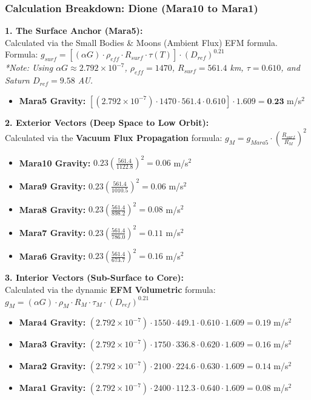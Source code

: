 \documentclass[11pt, a4paper]{article}
\begin{document}
\clearpage
\subsubsection{Calculation Breakdown: Dione (Mara10 to Mara1)}

\noindent \textbf{1. The Surface Anchor (Mara5):} \\
Calculated via the Small Bodies \& Moons (Ambient Flux) EFM formula. \\
Formula: $g_{surf} = \left[ (\alpha G) \cdot \rho_{eff} \cdot R_{surf} \cdot \tau(T) \right] \cdot (D_{ref})^{0.21}$ \\
\textit{*Note: Using $\alpha G \approx 2.792 \times 10^{-7}$, $\rho_{eff} = 1470$, $R_{surf} = 561.4$ km, $\tau = 0.610$, and Saturn $D_{ref} = 9.58$ AU.}
\begin{itemize}
  \item \textbf{Mara5 Gravity:} $\left[ (2.792 \times 10^{-7}) \cdot 1470 \cdot 561.4 \cdot 0.610 \right] \cdot 1.609 = \textbf{0.23}$ m/s$^2$
\end{itemize}

\vspace{0.5em}
\noindent \textbf{2. Exterior Vectors (Deep Space to Low Orbit):} \\
Calculated via the \textbf{Vacuum Flux Propagation} formula: $g_M = g_{Mara5} \cdot \left( \frac{R_{surf}}{R_M} \right)^2$
\begin{itemize}
  \item \textbf{Mara10 Gravity:} $0.23 \left( \frac{561.4}{1122.8} \right)^2 = 0.06$ m/s$^2$
  \item \textbf{Mara9 Gravity:} $0.23 \left( \frac{561.4}{1010.5} \right)^2 = 0.06$ m/s$^2$
  \item \textbf{Mara8 Gravity:} $0.23 \left( \frac{561.4}{898.2} \right)^2 = 0.08$ m/s$^2$
  \item \textbf{Mara7 Gravity:} $0.23 \left( \frac{561.4}{786.0} \right)^2 = 0.11$ m/s$^2$
  \item \textbf{Mara6 Gravity:} $0.23 \left( \frac{561.4}{673.7} \right)^2 = 0.16$ m/s$^2$
\end{itemize}

\vspace{0.5em}
\noindent \textbf{3. Interior Vectors (Sub-Surface to Core):} \\
Calculated via the dynamic \textbf{EFM Volumetric} formula: $g_M = (\alpha G) \cdot \rho_{M} \cdot R_M \cdot \tau_M \cdot (D_{ref})^{0.21}$
\begin{itemize}
  \item \textbf{Mara4 Gravity:} $(2.792 \times 10^{-7}) \cdot 1550 \cdot 449.1 \cdot 0.610 \cdot 1.609 = 0.19$ m/s$^2$
  \item \textbf{Mara3 Gravity:} $(2.792 \times 10^{-7}) \cdot 1750 \cdot 336.8 \cdot 0.620 \cdot 1.609 = 0.16$ m/s$^2$
  \item \textbf{Mara2 Gravity:} $(2.792 \times 10^{-7}) \cdot 2100 \cdot 224.6 \cdot 0.630 \cdot 1.609 = 0.14$ m/s$^2$
  \item \textbf{Mara1 Gravity:} $(2.792 \times 10^{-7}) \cdot 2400 \cdot 112.3 \cdot 0.640 \cdot 1.609 = 0.08$ m/s$^2$
\end{itemize}
\end{document}
